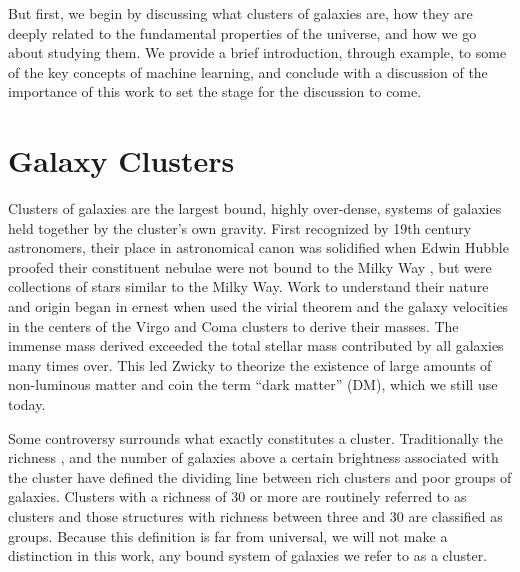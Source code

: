 But first, we begin by discussing what clusters of galaxies are, how they are deeply related to the fundamental properties of the universe, and how we go about studying them. We provide a brief introduction, through example, to some of the key concepts of machine learning, and conclude with a discussion of the importance of this work to set the stage for the discussion to come.

\section{Galaxy Clusters}
Clusters of galaxies are the largest bound, highly over-dense, systems of galaxies held together by the cluster's own gravity. First recognized by 19th century astronomers, their place in astronomical canon was solidified when Edwin Hubble proofed their constituent nebulae were not bound to the Milky Way \citep{Hubble1926}, but were collections of stars similar to the Milky Way. Work to understand their nature and origin began in ernest when \cite{Hubble1931} used the virial theorem and the galaxy velocities in the centers of the Virgo \citep{Smith1936} and Coma \citep{Zwicky1933} clusters to derive their masses. The immense mass derived exceeded the total stellar mass contributed by all galaxies many times over. This led Zwicky to theorize the existence of large amounts of non-luminous matter and coin the term ``dark matter'' (DM), which we still use today.  

Some controversy surrounds what exactly constitutes a cluster. Traditionally the richness \citep{Abell1958}, and the number of galaxies above a certain brightness associated with the cluster have defined the dividing line between rich clusters and poor groups of galaxies. Clusters with a richness of 30 or more are routinely referred to as clusters and those structures with richness between three and 30 are classified as groups. Because this definition is far from universal, we will not make a distinction in this work,  any bound system of galaxies we refer to as a cluster.


